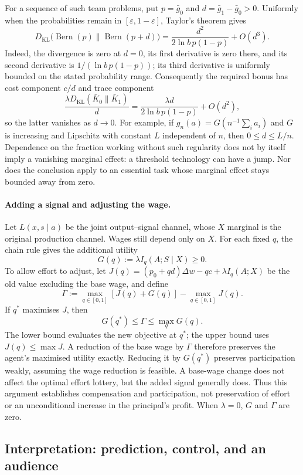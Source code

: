 \documentclass[11pt,a4paper]{article}
\theoremstyle{definition}
\newcommand{\I}{I}
\newcommand{\KL}{D_{\mathrm{KL}}}
\newcommand{\1}{\mathbf 1}
\begin{document}
For a sequence of such team problems, put $p=\bar g_0$ and
$d=\bar g_1-\bar g_0>0$.  Uniformly when the probabilities remain in
$[\varepsilon,1-\varepsilon]$, Taylor's theorem gives
\[
 \KL\bigl(\operatorname{Bern}(p)\|\operatorname{Bern}(p+d)\bigr)
 =\frac{d^2}{2\ln b\,p(1-p)}+O(d^3).
\]
Indeed, the divergence is zero at $d=0$, its first derivative is zero
there, and its second derivative is $1/(\ln b\,p(1-p))$; its third
derivative is uniformly bounded on the stated probability range.
Consequently the required bonus has cost component $c/d$ and trace
component
\[
 \frac{\lambda\KL(\bar K_0\|\bar K_1)}d
 =\frac{\lambda d}{2\ln b\,p(1-p)}+O(d^2),
\]
so the latter vanishes as $d\to0$.  For example, if
$g_n(a)=G(n^{-1}\sum_i a_i)$ and $G$ is increasing and Lipschitz with
constant $L$ independent of $n$, then $0\le d\le L/n$.
Dependence on the fraction working without such regularity does not by
itself imply a vanishing marginal effect: a threshold technology can have
a jump.  Nor does the conclusion apply to an essential task whose marginal
effect stays bounded away from zero.

\paragraph{Adding a signal and adjusting the wage.}
Let $L(x,s\mid a)$ be the joint output--signal channel, whose $X$ marginal
is the original production channel.  Wages still depend only on $X$.
For each fixed $q$, the chain rule gives the additional utility
\[
 G(q):=\lambda\I_q(A;S\mid X)\ge0.
\]
To allow effort to adjust, let
$J(q)=(p_0+qd)\Delta w-qc+\lambda\I_q(A;X)$ be the old value excluding
the base wage, and define
\[
 \Gamma:=\max_{q\in[0,1]}[J(q)+G(q)]-\max_{q\in[0,1]}J(q).
\]
If $q^*$ maximises $J$, then
\[
 G(q^*)\le\Gamma\le\max_q G(q).
\]
The lower bound evaluates the new objective at $q^*$; the upper bound
uses $J(q)\le\max J$.  A reduction of the base wage by $\Gamma$ therefore
preserves the agent's maximised utility exactly.  Reducing it by
$G(q^*)$ preserves participation weakly, assuming the wage reduction is
feasible.  A base-wage change does not affect the optimal effort lottery,
but the added signal generally does.  Thus this argument establishes
compensation and participation, not preservation of effort or an
unconditional increase in the principal's profit.  When $\lambda=0$,
$G$ and $\Gamma$ are zero.

\subsection{Interpretation: prediction, control, and an audience}
\label{app:interpretation-proofs}
\end{document}
